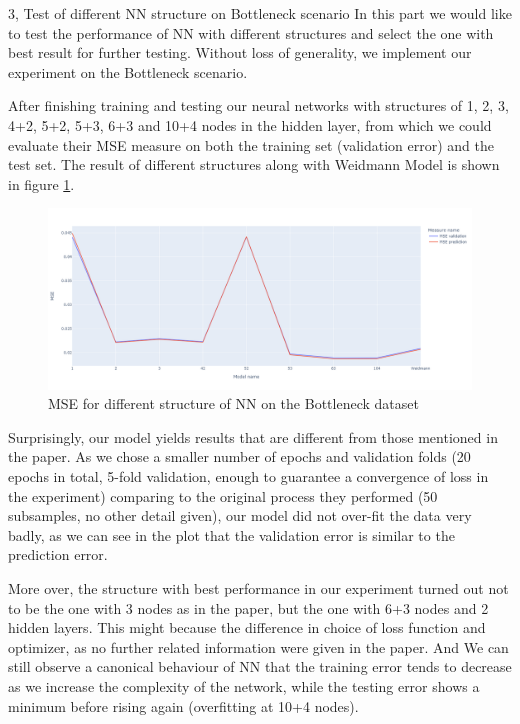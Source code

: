 \documentclass[10pt,a4paper]{article}
\begin{document}
\begin{task}{3, Test of different NN structure on Bottleneck scenario}
In this part we would like to test the performance of NN with different structures and select the one with best result for further testing. Without loss of generality, we implement our experiment on the Bottleneck scenario.

After finishing training and testing our neural networks with structures of 1, 2, 3, 4+2, 5+2, 5+3, 6+3 and 10+4 nodes in the hidden layer, from which we could evaluate their MSE measure on both the training set (validation error) and the test set. The result of different structures along with Weidmann Model is shown in figure \ref{MSE-b}.

\begin{figure} [H]
    \centering
    \includegraphics[width=17cm]{images/MSE of different structures for Bottleneck.png}
    \caption{MSE for different structure of NN on the Bottleneck dataset}
    \label{MSE-b}
\end{figure}

Surprisingly, our model yields results that are different from those mentioned in the paper. As we chose a smaller number of epochs and validation folds (20 epochs in total, 5-fold validation, enough to guarantee a convergence of loss in the experiment) comparing to the original process they performed (50 subsamples, no other detail given), our model did not over-fit the data very badly, as we can see in the plot that the validation error is similar to the prediction error. 

More over, the structure with best performance in our experiment turned out not to be the one with 3 nodes as in the paper, but the one with 6+3 nodes and 2 hidden layers. This might because the difference in choice of loss function and optimizer, as no further related information were given in the paper. And We can still observe a canonical behaviour of NN that the training error tends to decrease as we increase the complexity of the network, while the testing error shows a minimum before rising again (overfitting at 10+4 nodes).

\end{task}
\end{document}

